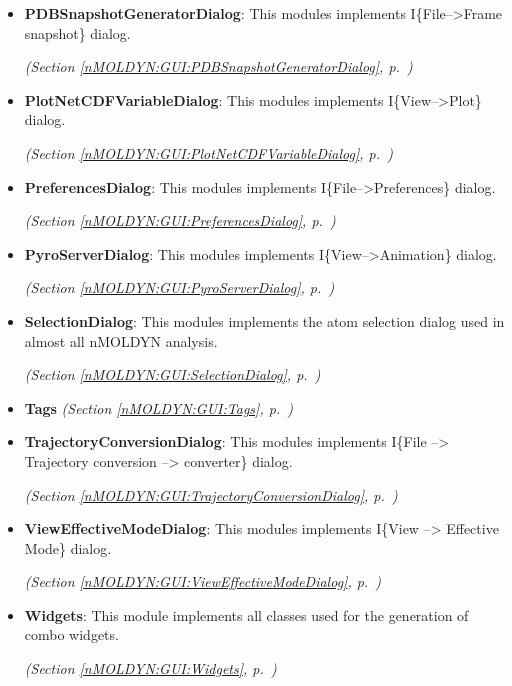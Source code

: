 \begin{itemize}
\item \textbf{PDBSnapshotGeneratorDialog}: This modules implements I\{File--{\textgreater}Frame snapshot\} dialog.



  \textit{(Section \ref{nMOLDYN:GUI:PDBSnapshotGeneratorDialog}, p.~\pageref{nMOLDYN:GUI:PDBSnapshotGeneratorDialog})}

\item \textbf{PlotNetCDFVariableDialog}: This modules implements I\{View--{\textgreater}Plot\} dialog.



  \textit{(Section \ref{nMOLDYN:GUI:PlotNetCDFVariableDialog}, p.~\pageref{nMOLDYN:GUI:PlotNetCDFVariableDialog})}

\item \textbf{PreferencesDialog}: This modules implements I\{File--{\textgreater}Preferences\} dialog.



  \textit{(Section \ref{nMOLDYN:GUI:PreferencesDialog}, p.~\pageref{nMOLDYN:GUI:PreferencesDialog})}

\item \textbf{PyroServerDialog}: This modules implements I\{View--{\textgreater}Animation\} dialog.



  \textit{(Section \ref{nMOLDYN:GUI:PyroServerDialog}, p.~\pageref{nMOLDYN:GUI:PyroServerDialog})}

\item \textbf{SelectionDialog}: This modules implements the atom selection dialog used in almost all nMOLDYN analysis.



  \textit{(Section \ref{nMOLDYN:GUI:SelectionDialog}, p.~\pageref{nMOLDYN:GUI:SelectionDialog})}

\item \textbf{Tags}
  \textit{(Section \ref{nMOLDYN:GUI:Tags}, p.~\pageref{nMOLDYN:GUI:Tags})}

\item \textbf{TrajectoryConversionDialog}: This modules implements I\{File --{\textgreater} Trajectory conversion --{\textgreater} converter\} dialog.



  \textit{(Section \ref{nMOLDYN:GUI:TrajectoryConversionDialog}, p.~\pageref{nMOLDYN:GUI:TrajectoryConversionDialog})}

\item \textbf{ViewEffectiveModeDialog}: This modules implements I\{View --{\textgreater} Effective Mode\} dialog.



  \textit{(Section \ref{nMOLDYN:GUI:ViewEffectiveModeDialog}, p.~\pageref{nMOLDYN:GUI:ViewEffectiveModeDialog})}

\item \textbf{Widgets}: This module implements all classes used for the generation of combo widgets. 


  \textit{(Section \ref{nMOLDYN:GUI:Widgets}, p.~\pageref{nMOLDYN:GUI:Widgets})}

\end{itemize}

